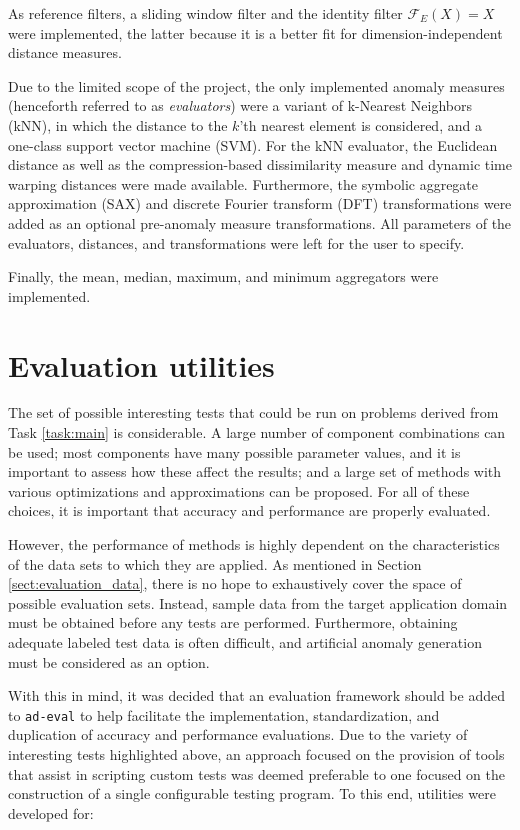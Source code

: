 As reference filters, a sliding window filter and the identity filter $\mathcal{F}_E(X)=X$ were implemented, the latter because it is a better fit for dimension-independent distance measures.

Due to the limited scope of the project, the only implemented anomaly measures (henceforth referred to as \emph{evaluators}) were a variant of k-Nearest Neighbors (kNN), in which the distance to the $k$'th nearest element is considered, and a one-class support vector machine (SVM). For the kNN evaluator, the Euclidean distance as well as the compression-based dissimilarity measure \cite{keogh2} and dynamic time warping \cite{dtw} distances were made available. Furthermore, the symbolic aggregate approximation (SAX) and discrete Fourier transform (DFT) transformations were added as an optional pre-anomaly measure transformations. All parameters of the evaluators, distances, and transformations were left for the user to specify.

Finally, the mean, median, maximum, and minimum aggregators were implemented.

\section{Evaluation utilities}
\label{sect:evaluation_package}

The set of possible interesting tests that could be run on problems derived from Task \ref{task:main} is considerable. A large number of component combinations can be used; most components have many possible parameter values, and it is important to assess how these affect the results; and a large set of methods with various optimizations and approximations can be proposed. For all of these choices, it is important that accuracy and performance are properly evaluated.

However, the performance of methods is highly dependent on the characteristics of the data sets to which they are applied. As mentioned in Section \ref{sect:evaluation_data}, there is no hope to exhaustively cover the space of possible evaluation sets. Instead, sample data from the target application domain must be obtained before any tests are performed. Furthermore, obtaining adequate labeled test data is often difficult, and artificial anomaly generation must be considered as an option.

With this in mind, it was decided that an evaluation framework should be added to \texttt{ad-eval} to help facilitate the implementation, standardization, and duplication of accuracy and performance evaluations. Due to the variety of interesting tests highlighted above, an approach focused on the provision of tools that assist in scripting custom tests was deemed preferable to one focused on the construction of a single configurable testing program. To this end, utilities were developed for:

